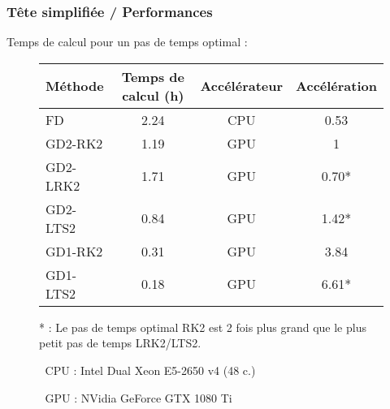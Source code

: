 \begin{frame}
\frametitle{Tête simplifiée / Performances}
\vfill
Temps de calcul pour un pas de temps optimal :
\begin{figure}
\centering
\begin{tabular}{|l|c|c|c|}
	\hline
	Méthode & Temps de calcul (h) & Accélérateur & Accélération \\ \hline\hline
	FD & 2.24 & CPU & 0.53 \\	\hline\hline
	GD2-RK2 & 1.19 & GPU & 1 \\	\hline
	GD2-LRK2 & 1.71 & GPU & 0.70* \\	\hline
	GD2-LTS2 & 0.84 & GPU & 1.42* \\	\hline\hline
	GD1-RK2 & 0.31 & GPU & 3.84 \\	\hline
	GD1-LTS2 & 0.18 & GPU & 6.61* \\	\hline
\end{tabular}
\vfill
* : Le pas de temps optimal RK2 est 2 fois plus grand que le plus petit pas de temps LRK2/LTS2.
\end{figure}
\vfill
\begin{itemize}
\item []
\begin{itemize}
\item [CPU] : Intel Dual Xeon E5-2650 v4 (48 c.)
\item [GPU] : NVidia GeForce GTX 1080 Ti
\end{itemize}
\end{itemize}
\vfill
\end{frame}


